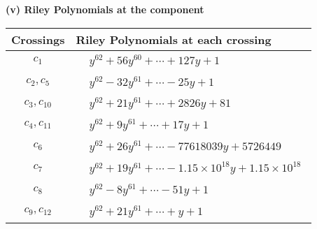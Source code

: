 \documentclass[1p]{elsarticle_modified}
\theoremstyle{definition}
\begin{document}
\newpage\renewcommand{\arraystretch}{1}
\flushleft \textbf{(v) Riley Polynomials at the component}\newline \\
\begin{tabular}{m{50pt}|m{274pt}}
Crossings & \hspace{64pt}Riley Polynomials at each crossing \\
\hline $$\begin{aligned}c_{1}\end{aligned}$$&$\begin{aligned}
&y^{62}+56 y^{60}+\cdots+127 y+1
\end{aligned}$\\
\hline $$\begin{aligned}c_{2},c_{5}\end{aligned}$$&$\begin{aligned}
&y^{62}-32 y^{61}+\cdots-25 y+1
\end{aligned}$\\
\hline $$\begin{aligned}c_{3},c_{10}\end{aligned}$$&$\begin{aligned}
&y^{62}+21 y^{61}+\cdots+2826 y+81
\end{aligned}$\\
\hline $$\begin{aligned}c_{4},c_{11}\end{aligned}$$&$\begin{aligned}
&y^{62}+9 y^{61}+\cdots+17 y+1
\end{aligned}$\\
\hline $$\begin{aligned}c_{6}\end{aligned}$$&$\begin{aligned}
&y^{62}+26 y^{61}+\cdots-77618039 y+5726449
\end{aligned}$\\
\hline $$\begin{aligned}c_{7}\end{aligned}$$&$\begin{aligned}
&y^{62}+19 y^{61}+\cdots-1.15\times10^{18} y+1.15\times10^{18}
\end{aligned}$\\
\hline $$\begin{aligned}c_{8}\end{aligned}$$&$\begin{aligned}
&y^{62}-8 y^{61}+\cdots-51 y+1
\end{aligned}$\\
\hline $$\begin{aligned}c_{9},c_{12}\end{aligned}$$&$\begin{aligned}
&y^{62}+21 y^{61}+\cdots+y+1
\end{aligned}$\\
\hline
\end{tabular}\\~\\
\end{document}
